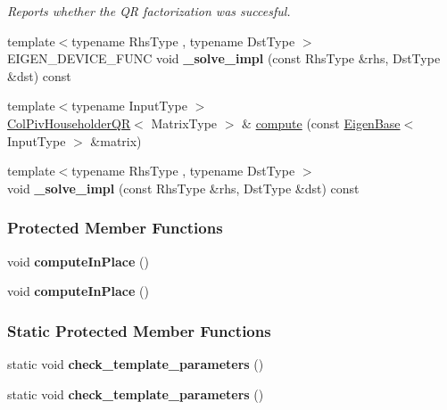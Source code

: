 \begin{DoxyCompactItemize}
\begin{DoxyCompactList}\small\item\em Reports whether the QR factorization was succesful. \end{DoxyCompactList}\item 
\mbox{\label{group___q_r___module_a22731a654f7568409c6a0d5592a192ba}} 
{\footnotesize template$<$typename Rhs\+Type , typename Dst\+Type $>$ }\\E\+I\+G\+E\+N\+\_\+\+D\+E\+V\+I\+C\+E\+\_\+\+F\+U\+NC void {\bfseries \+\_\+solve\+\_\+impl} (const Rhs\+Type \&rhs, Dst\+Type \&dst) const
\item 
{\footnotesize template$<$typename Input\+Type $>$ }\\\hyperlink{group___q_r___module_class_eigen_1_1_col_piv_householder_q_r}{Col\+Piv\+Householder\+QR}$<$ Matrix\+Type $>$ \& \hyperlink{group___q_r___module_a768c98c092250c9e319c3298b05f0f2d}{compute} (const \hyperlink{group___core___module_struct_eigen_1_1_eigen_base}{Eigen\+Base}$<$ Input\+Type $>$ \&matrix)
\item 
\mbox{\label{group___q_r___module_ae6bdb186aa81c7b4fae575c6e055ab47}} 
{\footnotesize template$<$typename Rhs\+Type , typename Dst\+Type $>$ }\\void {\bfseries \+\_\+solve\+\_\+impl} (const Rhs\+Type \&rhs, Dst\+Type \&dst) const
\end{DoxyCompactItemize}
\subsubsection*{Protected Member Functions}
\begin{DoxyCompactItemize}
\item 
\mbox{\label{group___q_r___module_a7bc043db5ef8072bc9be198404123a56}} 
void {\bfseries compute\+In\+Place} ()
\item 
\mbox{\label{group___q_r___module_adcf09fd6ae8999c0536acb73c1731843}} 
void {\bfseries compute\+In\+Place} ()
\end{DoxyCompactItemize}
\subsubsection*{Static Protected Member Functions}
\begin{DoxyCompactItemize}
\item 
\mbox{\label{group___q_r___module_a5a0113f1df3e804a7798ebaaaa2354ca}} 
static void {\bfseries check\+\_\+template\+\_\+parameters} ()
\item 
\mbox{\label{group___q_r___module_a5a0113f1df3e804a7798ebaaaa2354ca}} 
static void {\bfseries check\+\_\+template\+\_\+parameters} ()
\end{DoxyCompactItemize}
